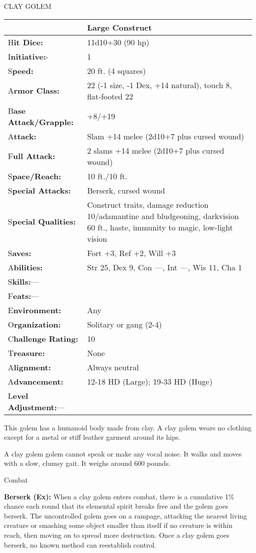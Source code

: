 \documentclass{article}
\begin{document}
CLAY GOLEM

\begin{tabular}{|>{\raggedright}p{91pt}|>{\raggedright}p{235pt}|}
\hline
  & Large Construct\tabularnewline
\hline
H\textbf{it Dice:} & 11d10+30 (90 hp)\tabularnewline
\hline
I\textbf{nitiative:}- & 1\tabularnewline
\hline
S\textbf{peed:} & 20 ft. (4 squares)\tabularnewline
\hline
A\textbf{rmor Class:} & 22 (-1 size, -1 Dex, +14 natural), touch 8, flat-footed 
22\tabularnewline
\hline
B\textbf{ase Attack/Grapple:} & +8/+19\tabularnewline
\hline
A\textbf{ttack:} & Slam +14 melee (2d10+7 plus cursed wound)\tabularnewline
\hline
F\textbf{ull Attack:} & 2 slams +14 melee (2d10+7 plus cursed wound)\tabularnewline
\hline
S\textbf{pace/Reach:} & 10 ft./10 ft.\tabularnewline
\hline
S\textbf{pecial Attacks:} & Berserk, cursed wound\tabularnewline
\hline
S\textbf{pecial Qualities:} & Construct traits, damage reduction 10/adamantine 
and bludgeoning, darkvision 60 ft., haste, immunity to magic, low-light vision\tabularnewline
\hline
S\textbf{aves:} & Fort +3, Ref +2, Will +3\tabularnewline
\hline
A\textbf{bilities:} & Str 25, Dex 9, Con ---, Int ---, Wis 11, Cha 1\tabularnewline
\hline
S\textbf{kills:}--- & \tabularnewline
\hline
F\textbf{eats:}--- & \tabularnewline
\hline
E\textbf{nvironment:} & Any\tabularnewline
\hline
O\textbf{rganization:} & Solitary or gang (2-4)\tabularnewline
\hline
C\textbf{hallenge Rating:} & 10\tabularnewline
\hline
T\textbf{reasure:} & None\tabularnewline
\hline
A\textbf{lignment:} & Always neutral\tabularnewline
\hline
A\textbf{dvancement:} & 12-18 HD (Large); 19-33 HD (Huge)\tabularnewline
\hline
L\textbf{evel Adjustment:}--- & \tabularnewline
\hline
\end{tabular}

This golem has a humanoid body made from clay. A clay golem wears no clothing except 
for a metal or stiff leather garment around its hips.

A clay golem golem cannot speak or make any vocal noise. It walks and moves with 
a slow, clumsy gait. It weighs around 600 pounds.

Combat

\textbf{Berserk (Ex):} When a clay golem enters combat, there is a cumulative 1\% 
chance each round that its elemental spirit breaks free and the golem goes berserk. 
The uncontrolled golem goes on a rampage, attacking the nearest living creature 
or smashing some object smaller than itself if no creature is within reach, then 
moving on to spread more destruction. Once a clay golem goes berserk, no known 
method can reestablish control.
\end{document}
